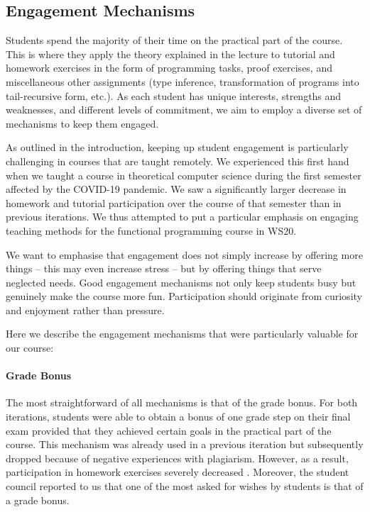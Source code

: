 \subsection{Engagement Mechanisms}\label{sec:engagement}

Students spend the majority of their time on the practical part of the course.
This is where they apply the theory explained in the lecture to tutorial and homework exercises in the form of programming tasks, proof exercises, and miscellaneous other assignments (type inference, transformation of programs into tail-recursive form, etc.).
As each student has unique interests, strengths and weaknesses, and different levels of commitment,
we aim to employ a diverse set of mechanisms to keep them engaged.

As outlined in the introduction, keeping up student engagement is particularly challenging in courses that are taught remotely. We experienced this first hand when we taught a course in theoretical computer science during the first semester affected by the COVID-19 pandemic. We saw a significantly larger decrease in homework and tutorial participation over the course of that semester than in previous iterations. We thus attempted to put a particular emphasis on engaging teaching methods for the functional programming course in WS20.

We want to emphasise that engagement does not simply
increase by offering more things -- this may even increase stress --
but by offering things that serve neglected needs.
Good engagement mechanisms not only keep students busy
but genuinely make the course more fun.
Participation should originate from curiosity and enjoyment rather than pressure.

Here we describe the engagement mechanisms that were particularly valuable for our course:

\paragraph{Grade Bonus}
The most straightforward of all mechanisms is
that of the grade bonus.
For both iterations,
students were able to obtain a bonus of one grade step on their final exam provided that they achieved certain goals in the practical part of the course.
This mechanism was already used in a previous iteration
but subsequently dropped because of negative experiences with plagiarism.
However, as a result, participation in homework exercises
severely decreased \cite{next_1100}.
Moreover, the student council reported to us that one of the most asked for
wishes by students is that of a grade bonus.

